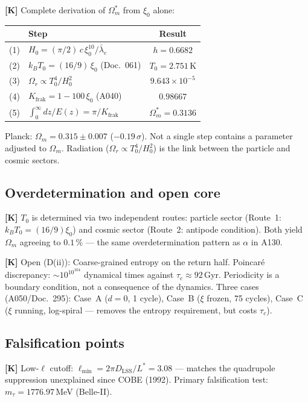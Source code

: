 \textbf{[K]} Complete derivation of $\Omega_m^*$ from $\xi_0$ alone:
\begin{center}
\small
\begin{tabular}{clc}
\toprule
& Step & Result \\
\midrule
(1) & $H_0 = (\pi/2)\,c\,\xi_0^{10}/\bar\lambda_e$ & $h = 0{.}6682$ \\
(2) & $k_BT_0 = (16/9)\,\xi_0$ (Doc.~061) & $T_0 = 2{.}751$\,K \\
(3) & $\Omega_r \propto T_0^4/H_0^2$ & $9{.}643\times10^{-5}$ \\
(4) & $K_\text{frak} = 1-100\,\xi_0$ (A040) & $0{.}98667$ \\
(5) & $\int_0^\infty dz/E(z) = \pi/K_\text{frak}$ &
  $\boxed{\Omega_m^* = 0{.}3136}$ \\
\bottomrule
\end{tabular}
\end{center}
Planck: $\Omega_m = 0{.}315 \pm 0{.}007$ ($-0{.}19\,\sigma$).
Not a single step contains a parameter adjusted to $\Omega_m$.
Radiation ($\Omega_r \propto T_0^4/H_0^2$) is the link between
the particle and cosmic sectors.

\subsection{Overdetermination and open core}

\textbf{[K]} $T_0$ is determined via two independent routes:
particle sector (Route~1: $k_BT_0 = (16/9)\xi_0$) and cosmic sector
(Route~2: antipode condition). Both yield $\Omega_m$ agreeing to
$0{.}1\,\%$ --- the same overdetermination pattern as $\alpha$ in A130.

\textbf{[K]} Open (D(ii)): Coarse-grained entropy on the return half.
Poincaré discrepancy: $\sim 10^{10^{104}}$ dynamical times against
$\tau_c \approx 92$\,Gyr. Periodicity is a boundary condition, not a
consequence of the dynamics. Three cases (A050/Doc.~295):
Case~A ($d=0$, 1 cycle), Case~B ($\xi$ frozen, 75 cycles),
Case~C ($\xi$ running, log-spiral --- removes the entropy requirement,
but costs $\tau_c$).

\subsection{Falsification points}

\textbf{[K]} Low-$\ell$ cutoff: $\ell_\text{min} = 2\pi D_\text{LSS}/L^* = 3{.}08$
--- matches the quadrupole suppression unexplained since COBE (1992).
Primary falsification test: $m_\tau = 1776{.}97$\,MeV (Belle-II).

